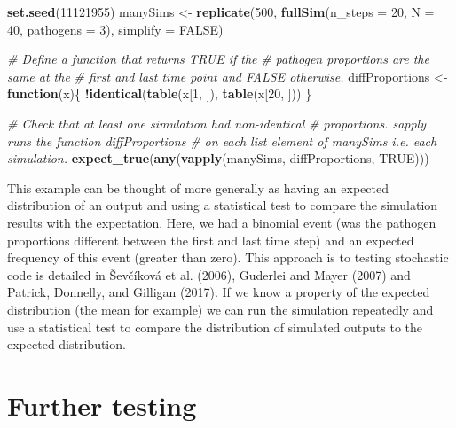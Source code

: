 \documentclass[]{elsarticle} %
\newenvironment{Shaded}{\begin{snugshade}}{\end{snugshade}}
\newcommand{\CommentTok}[1]{\textcolor[rgb]{0.56,0.35,0.01}{\textit{#1}}}
\newcommand{\ControlFlowTok}[1]{\textcolor[rgb]{0.13,0.29,0.53}{\textbf{#1}}}
\newcommand{\DataTypeTok}[1]{\textcolor[rgb]{0.13,0.29,0.53}{#1}}
\newcommand{\DecValTok}[1]{\textcolor[rgb]{0.00,0.00,0.81}{#1}}
\newcommand{\KeywordTok}[1]{\textcolor[rgb]{0.13,0.29,0.53}{\textbf{#1}}}
\newcommand{\NormalTok}[1]{#1}
\newcommand{\OperatorTok}[1]{\textcolor[rgb]{0.81,0.36,0.00}{\textbf{#1}}}
\newcommand{\OtherTok}[1]{\textcolor[rgb]{0.56,0.35,0.01}{#1}}
\newcommand{\StringTok}[1]{\textcolor[rgb]{0.31,0.60,0.02}{#1}}
\begin{document}
\begin{Shaded}
\begin{Highlighting}[]
\KeywordTok{set.seed}\NormalTok{(}\DecValTok{11121955}\NormalTok{)}
\NormalTok{manySims <-}\StringTok{ }\KeywordTok{replicate}\NormalTok{(}\DecValTok{500}\NormalTok{, }
                      \KeywordTok{fullSim}\NormalTok{(}\DataTypeTok{n_steps =} \DecValTok{20}\NormalTok{, }\DataTypeTok{N =} \DecValTok{40}\NormalTok{, }
                              \DataTypeTok{pathogens =} \DecValTok{3}\NormalTok{), }
                      \DataTypeTok{simplify =} \OtherTok{FALSE}\NormalTok{)}

\CommentTok{# Define a function that returns TRUE if the}
\CommentTok{#   pathogen proportions are the same at the }
\CommentTok{#   first and last time point and FALSE otherwise.}
\NormalTok{diffProportions <-}\StringTok{ }\ControlFlowTok{function}\NormalTok{(x)\{}
  \OperatorTok{!}\KeywordTok{identical}\NormalTok{(}\KeywordTok{table}\NormalTok{(x[}\DecValTok{1}\NormalTok{, ]), }\KeywordTok{table}\NormalTok{(x[}\DecValTok{20}\NormalTok{, ]))}
\NormalTok{\}}

\CommentTok{# Check that at least one simulation had non-identical}
\CommentTok{#   proportions. sapply runs the function diffProportions }
\CommentTok{#   on each list element of manySims i.e. each simulation.}
\KeywordTok{expect_true}\NormalTok{(}\KeywordTok{any}\NormalTok{(}\KeywordTok{vapply}\NormalTok{(manySims, diffProportions, }\OtherTok{TRUE}\NormalTok{)))}
\end{Highlighting}
\end{Shaded}

This example can be thought of more generally as having an expected distribution of an output and using a statistical test to compare the simulation results with the expectation.
Here, we had a binomial event (was the pathogen proportions different between the first and last time step) and an expected frequency of this event (greater than zero).
This approach is to testing stochastic code is detailed in Ševčíková et al. (2006), Guderlei and Mayer (2007) and Patrick, Donnelly, and Gilligan (2017).
If we know a property of the expected distribution (the mean for example) we can run the simulation repeatedly and use a statistical test to compare the distribution of simulated outputs to the expected distribution.

\hypertarget{further-testing}{%
\section{Further testing}\label{further-testing}}
\end{document}
